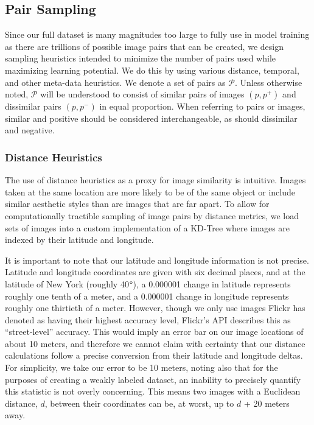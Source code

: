 \subsection{Pair Sampling}\label{sec:pair_sampling}
Since our full dataset is many magnitudes too large to fully use in model training as there are trillions of possible image pairs that can be created, we design sampling heuristics intended to minimize the number of pairs used while maximizing learning potential. We do this by using various distance, temporal, and other meta-data heuristics. We denote a set of pairs as $\mathcal{P}$. Unless otherwise noted, $\mathcal{P}$ will be understood to consist of similar pairs of images $(p, p^+)$ and dissimilar pairs $(p, p^-)$ in equal proportion. When referring to pairs or images, similar and positive should be considered interchangeable, as should dissimilar and negative. 

\subsubsection{Distance Heuristics}
The use of distance heuristics as a proxy for image similarity is intuitive. Images taken at the same location are more likely to be of the same object or include similar aesthetic styles than are images that are far apart. To allow for computationally tractible sampling of image pairs by distance metrics, we load sets of images into a custom implementation of a KD-Tree where images are indexed by their latitude and longitude. 

It is important to note that our latitude and longitude information is not precise. Latitude and longitude coordinates are given with six decimal places, and at the latitude of New York (roughly 40$\degree$), a 0.000001 change in latitude represents roughly one tenth of a meter, and a 0.000001 change in longitude represents roughly one thirtieth of a meter. However, though we only use images Flickr has denoted as having their highest accuracy level, Flickr's API describes this as ``street-level'' accuracy. This would imply an error bar on our image locations of about 10 meters, and therefore we cannot claim with certainty that our distance calculations follow a precise conversion from their latitude and longitude deltas. For simplicity, we take our error to be 10 meters, noting also that for the purposes of creating a weakly labeled dataset, an inability to precisely quantify this statistic is not overly concerning. This means two images with a Euclidean distance, $d$, between their coordinates can be, at worst, up to $d$ + 20 meters away. 

